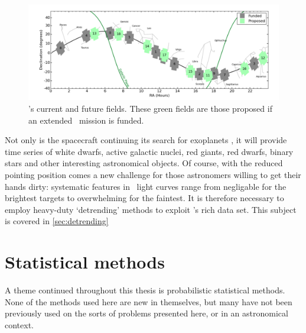 \begin{figure}[p]
\begin{center}
\includegraphics[width=6in, clip=true]{figures/Future_K2_fields.pdf}
\caption[Future \ktwo\ fields]{\ktwo's current and future fields. These green
fields are those proposed if an extended \ktwo\ mission is funded.}
\label{fig:future_fields}
\end{center}
\end{figure}

Not only is the spacecraft continuing its search for exoplanets \citep[and has
already discovered many, \eg][]{Vanderburg2015, Crossfield2015,
Foreman-Mackey2015, Montet2015, Becker2015, Vanderburg2016}, it will
provide time series of white dwarfs, active galactic nuclei, red giants, red
dwarfs, binary stars and other interesting astronomical objects.
Of course, with the reduced pointing position comes a new challenge for those
astronomers willing to get their hands dirty: systematic features in \ktwo\
light curves range from negligable for the brightest targets to overwhelming
for the faintest.
It is therefore necessary to employ heavy-duty `detrending' methods to
exploit \ktwo's rich data set.
This subject is covered in \textsection \ref{sec:detrending}

\section{Statistical methods}

A theme continued throughout this thesis is probabilistic statistical methods.
None of the methods used here are new in themselves, but many have not been
previously used on the sorts of problems presented here, or in an astronomical
context.

